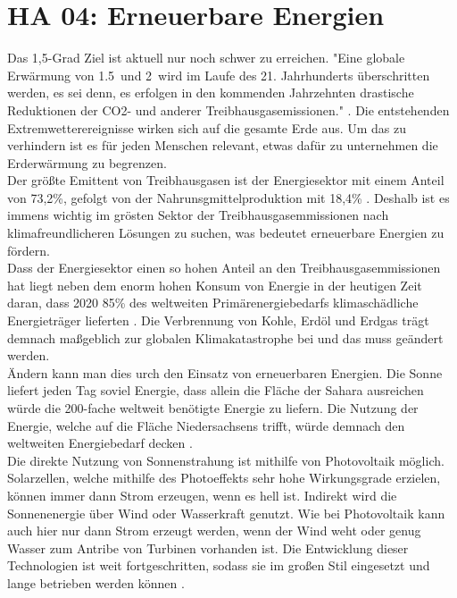 \section{HA 04: Erneuerbare Energien}
  Das 1,5-Grad Ziel ist aktuell nur noch schwer zu erreichen. "Eine globale Erwärmung von 1.5\textcelsius\ und 2\textcelsius\ wird im Laufe des 21. Jahrhunderts überschritten werden, es sei denn, es erfolgen in den kommenden Jahrzehnten drastische Reduktionen der CO2- und anderer Treibhausgasemissionen." \cite{ipcc_climate_2021}. Die entstehenden Extremwetterereignisse wirken sich auf die gesamte Erde aus. Um das zu verhindern ist es für jeden Menschen relevant, etwas dafür zu unternehmen die Erderwärmung zu begrenzen.\\
  Der größte Emittent von Treibhausgasen ist der Energiesektor mit einem Anteil von 73,2\%, gefolgt von der Nahrunsgmittelproduktion mit 18,4\% \cite{ritchie_co_2020}. Deshalb ist es immens wichtig im grösten Sektor der Treibhausgasemmissionen nach klimafreundlicheren Lösungen zu suchen, was bedeutet erneuerbare Energien zu fördern.\\
  Dass der Energiesektor einen so hohen Anteil an den Treibhausgasemmissionen hat liegt neben dem enorm hohen Konsum von Energie in der heutigen Zeit daran, dass 2020 85\% des weltweiten Primärenergiebedarfs klimaschädliche Energieträger lieferten \cite{quaschning_regenerative_2019}. Die Verbrennung von Kohle, Erdöl und Erdgas trägt demnach maßgeblich zur globalen Klimakatastrophe bei und das muss geändert werden.\\
  Ändern kann man dies urch den Einsatz von erneuerbaren Energien. Die Sonne liefert jeden Tag soviel Energie, dass allein die Fläche der Sahara ausreichen würde die 200-fache weltweit benötigte Energie zu liefern. Die Nutzung der Energie, welche auf die Fläche Niedersachsens trifft, würde demnach den weltweiten Energiebedarf decken \cite{quaschning_regenerative_2019}.\\
 Die direkte Nutzung von Sonnenstrahung ist mithilfe von Photovoltaik möglich. Solarzellen, welche mithilfe des Photoeffekts sehr hohe Wirkungsgrade erzielen, können immer dann Strom erzeugen, wenn es hell ist. Indirekt wird die Sonnenenergie über Wind oder Wasserkraft genutzt. Wie bei Photovoltaik kann auch hier nur dann Strom erzeugt werden, wenn der Wind weht oder genug Wasser zum Antribe von Turbinen vorhanden ist. Die Entwicklung dieser Technologien ist weit fortgeschritten, sodass sie im großen Stil eingesetzt und lange betrieben werden können \cite{quaschning_regenerative_2019}.\\
